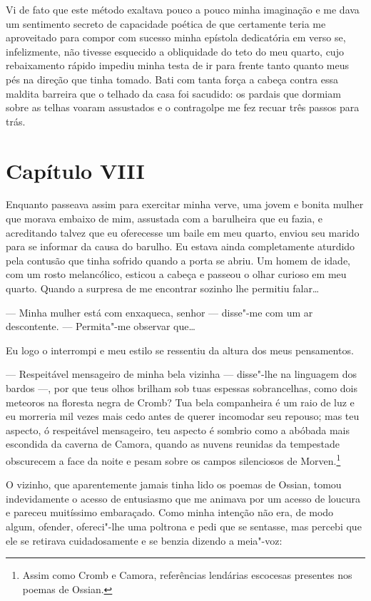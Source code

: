  Vi de fato que este método exaltava pouco a pouco minha imaginação e me
dava um sentimento secreto de capacidade poética de que certamente
teria me aproveitado para compor com sucesso minha epístola dedicatória em
verso se, infelizmente, não tivesse esquecido a obliquidade do teto do
meu quarto, cujo rebaixamento rápido impediu minha testa de ir para
frente tanto quanto meus pés na direção que tinha tomado. Bati com
tanta força a cabeça contra essa maldita barreira que o telhado da casa
foi sacudido: os pardais que dormiam sobre as telhas voaram assustados
e o contragolpe me fez recuar três passos para trás.

\section*{Capítulo VIII}

 Enquanto passeava assim para exercitar minha verve, uma jovem e bonita
mulher que morava embaixo de mim, assustada com a barulheira que eu
fazia, e acreditando talvez que eu oferecesse um baile em meu quarto,
enviou seu marido para se informar da causa do barulho. Eu estava ainda
completamente aturdido pela contusão que tinha sofrido quando a porta
se abriu. Um homem de idade, com um rosto melancólico, esticou a cabeça
e passeou o olhar curioso em meu quarto. Quando a surpresa de me
encontrar sozinho lhe permitiu falar\ldots

--- Minha mulher está com enxaqueca, senhor --- disse"-me com um ar
descontente. --- Permita"-me observar que\ldots

Eu logo o interrompi e meu estilo se ressentiu da altura dos meus
pensamentos. 

--- Respeitável mensageiro de minha bela vizinha --- disse"-lhe na
linguagem dos bardos ---, por que teus olhos brilham sob tuas espessas
sobrancelhas, como dois meteoros na floresta negra de Cromb? Tua bela
companheira é um raio de luz e eu morreria mil vezes mais cedo antes de
querer incomodar seu repouso; mas teu aspecto, ó respeitável
mensageiro, teu aspecto é sombrio como a abóbada mais escondida da
caverna de Camora, quando as nuvens reunidas da tempestade obscurecem a
face da noite e pesam sobre os campos silenciosos de Morven.\footnote{ Assim 
como Cromb e Camora, referências lendárias escocesas presentes
nos poemas de Ossian.}

O vizinho, que aparentemente jamais tinha lido os poemas de Ossian,
tomou indevidamente o acesso de entusiasmo que me animava por um acesso
de loucura e pareceu muitíssimo embaraçado. Como minha intenção não
era, de modo algum, ofender, ofereci"-lhe uma poltrona e pedi que se
sentasse, mas percebi que ele se retirava cuidadosamente e se benzia
dizendo a meia"-voz: 


